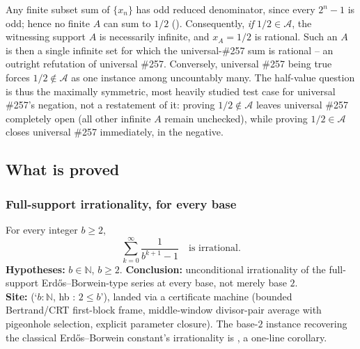 \begin{obs}
\label{obs:half-controls-universal}
Any finite subset sum of $\{x_n\}$ has odd reduced denominator, since every $2^n - 1$ is odd; hence
no finite $A$ can sum to $1/2$ ().
Consequently, \emph{if} $1/2 \in \mathcal{A}$, the witnessing support $A$ is necessarily infinite, and
$x_A = 1/2$ is rational. Such an $A$ is then a single infinite set for which the universal-\#257
sum is rational -- an outright refutation of universal \#257. Conversely, universal \#257 being true
forces $1/2 \notin \mathcal{A}$ as one instance among uncountably many. The half-value question is
thus the maximally symmetric, most heavily studied test case for universal \#257's negation, not a
restatement of it: proving $1/2 \notin \mathcal{A}$ leaves universal \#257 completely open (all other
infinite $A$ remain unchecked), while proving $1/2 \in \mathcal{A}$ closes universal \#257
immediately, in the negative.  
\end{obs}

\subsection{What is proved}

\subsubsection{Full-support irrationality, for every base}

\begin{thm}
\label{thm:full-support}
For every integer $b \ge 2$,
\[
\sum_{k=0}^{\infty} \frac{1}{b^{k+1}-1} \quad \text{is irrational.}
\]
\textbf{Hypotheses:} $b \in \mathbb{N}$, $b \ge 2$. \textbf{Conclusion:} unconditional irrationality
of the full-support Erd\H{o}s--Borwein-type series at every base, not merely base $2$.
  \\
\textbf{Site:} 
(`$b : \mathbb{N}$, hb : $2 \le b$'), landed via a certificate machine (bounded Bertrand/CRT
first-block frame, middle-window divisor-pair average with pigeonhole selection, explicit parameter
closure). The base-$2$ instance recovering the classical Erd\H{o}s--Borwein constant's irrationality
is , a one-line corollary.
\end{thm}

